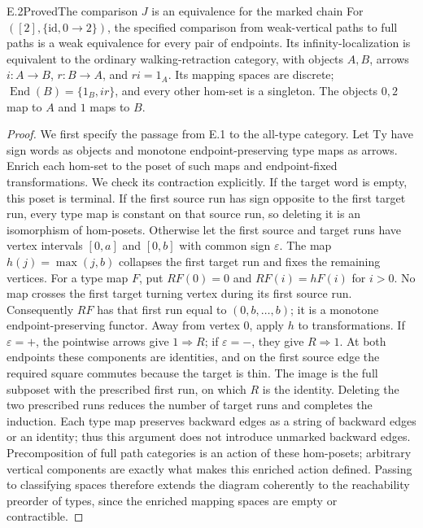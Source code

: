 \begin{result}{E.2}{Proved}{The comparison $J$ is an equivalence for the marked chain}
For $([2],\{\mathrm{id},0\to2\})$, the specified comparison from weak-vertical paths to full paths is a weak equivalence for every pair of endpoints. Its infinity-localization is equivalent to the ordinary walking-retraction category, with objects $A,B$, arrows $i:A\to B$, $r:B\to A$, and $ri=1_A$. Its mapping spaces are discrete; $\operatorname{End}(B)=\{1_B,ir\}$, and every other hom-set is a singleton. The objects $0,2$ map to $A$ and $1$ maps to $B$.
\end{result}
\begin{proof}
We first specify the passage from E.1 to the all-type category. Let $\mathrm{Ty}$ have sign words as objects and monotone endpoint-preserving type maps as arrows. Enrich each hom-set to the poset of such maps and endpoint-fixed transformations. We check its contraction explicitly. If the target word is empty, this poset is terminal. If the first source run has sign opposite to the first target run, every type map is constant on that source run, so deleting it is an isomorphism of hom-posets. Otherwise let the first source and target runs have vertex intervals $[0,a]$ and $[0,b]$ with common sign $\varepsilon$. The map $h(j)=\max(j,b)$ collapses the first target run and fixes the remaining vertices. For a type map $F$, put $RF(0)=0$ and $RF(i)=hF(i)$ for $i>0$. No map crosses the first target turning vertex during its first source run. Consequently $RF$ has that first run equal to $(0,b,\ldots,b)$; it is a monotone endpoint-preserving functor. Away from vertex $0$, apply $h$ to transformations. If $\varepsilon=+$, the pointwise arrows give $1\Rightarrow R$; if $\varepsilon=-$, they give $R\Rightarrow1$. At both endpoints these components are identities, and on the first source edge the required square commutes because the target is thin. The image is the full subposet with the prescribed first run, on which $R$ is the identity. Deleting the two prescribed runs reduces the number of target runs and completes the induction. Each type map preserves backward edges as a string of backward edges or an identity; thus this argument does not introduce unmarked backward edges. Precomposition of full path categories is an action of these hom-posets; arbitrary vertical components are exactly what makes this enriched action defined. Passing to classifying spaces therefore extends the diagram coherently to the reachability preorder of types, since the enriched mapping spaces are empty or contractible.


\end{proof}
